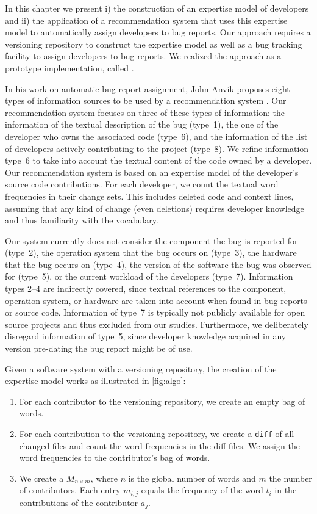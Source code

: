 In this chapter we present i) the construction of an expertise model of developers and ii) the application of a recommendation system that uses this expertise model to automatically assign developers to bug reports. Our approach requires a versioning repository to construct the expertise model as well as a bug tracking facility to assign developers to bug reports. We realized the approach as a prototype implementation, called \DEVLECT.

In his work on automatic bug report assignment, John Anvik proposes eight types of information sources to be used by a recommendation system \cite{Anvi06b}. Our recommendation system focuses on three of these types of information: the information of the textual description of the bug (type~1), the one of the developer who owns the associated code (type~6), and the information of the list of developers actively contributing to the project (type~8). We refine information type~6 to take into account the textual content of the code owned by a developer. Our recommendation system is based on an expertise model of the developer's source code contributions. For each developer, we count the textual word frequencies in their change sets. This includes deleted code and context lines, assuming that any kind of change (even deletions) requires developer knowledge and thus familiarity with the vocabulary. 

Our system currently does not consider the component the bug is reported for (type~2), the operation system that the bug occurs on (type~3), the hardware that the bug occurs on (type~4), the version of the software the bug was observed for (type~5), or the current workload of the developers (type~7). Information types 2--4 are indirectly covered, since textual references to the component, operation system, or hardware are taken into account when found in bug reports or source code. Information of type~7 is typically not publicly available for open source projects and thus excluded from our studies. Furthermore, we deliberately disregard information of type~5, since developer knowledge acquired in any version pre-dating the bug report might be of use. 

Given a software system with a versioning repository, the creation of the expertise model works as illustrated in \autoref{fig:algo}:

\begin{enumerate}
\item For each contributor to the versioning repository, we create an empty bag of words. 
\item For each contribution to the versioning repository, we create a \verb$diff$ of all changed files and count the word frequencies in the diff files. We assign the word frequencies to the contributor's bag of words.
\item We create a \TAM $M_{n \times m}$, where $n$ is the global number of words and $m$ the number of contributors. Each entry $m_{i,j}$ equals the frequency of the word $t_i$ in the contributions of the contributor $a_j$. 
\end{enumerate}

